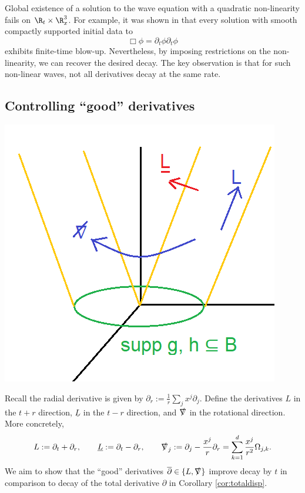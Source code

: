 Global existence of a solution to the wave equation with a quadratic non-linearity fails on $\R_t \times \R^3_x$. For example, it was shown in \cite{john1981} that every solution with smooth compactly supported initial data to 
	\[ \Box \phi = \partial_t \phi \partial_t \phi\]
exhibits finite-time blow-up. Nevertheless, by imposing restrictions on the non-linearity, we can recover the desired decay. The key observation is that for such non-linear waves, not all derivatives decay at the same rate.

\subsection{Controlling ``good'' derivatives}

\begin{center}
	\includegraphics[scale = 0.5]{peeling}
\end{center}
Recall the radial derivative is given by $\partial_r := \frac1r \sum_j x^j \partial_j$. Define the derivatives $L$ in the $t + r$ direction, $\underline L$ in the $t - r$ direction, and $\slashed \nabla$ in the rotational direction. More concretely, 
\begin{align*}
	L
		:= \partial_t + \partial_r, \qquad
	\underline L
		:= \partial_t - \partial_r, \qquad
	\slashed\nabla_j  
		:= \partial_j  - \frac{x^j}{r} \partial_r  = \sum_{k = 1}^d \frac{x^j}{r^2} \Omega_{j, k} .
\end{align*}		
We aim to show that the ``good'' derivatives $\overline \partial \in \{ L, \slashed \nabla \}$ improve decay by $t$ in comparison to decay of the total derivative $\partial$ in Corollary \ref{cor:totaldisp}. 

